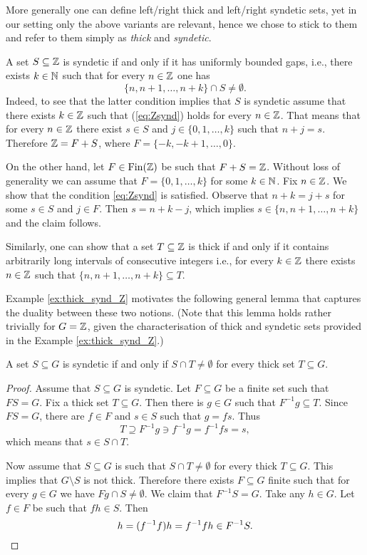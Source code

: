 \noindent
More generally one can define left/right thick and left/right syndetic sets, yet in our setting only the above variants are relevant, hence we chose to stick to them and refer to them simply as \emph{thick} and \emph{syndetic}.

\begin{example}\label{ex:thick_synd_Z}
A set $S\subseteq\mathbb{Z}$ is syndetic if and only if it has uniformly bounded gaps, i.e., there exists $k\in\mathbb{N}$ such that for every $n\in\mathbb{Z}$ one has 
\begin{equation}\label{eq:Zsynd}
\{n,n+1,\ldots,n+k\}\cap S\neq\emptyset.
\end{equation}
Indeed, to see that the latter condition implies that $S$ is syndetic assume that there exists $k\in\mathbb{Z}$ such that (\ref{eq:Zsynd}) holds for every $n\in\mathbb{Z}$. That means that for every $n\in\mathbb{Z}$ there exist $s\in S$ and $j\in\{0,1,\ldots,k\}$ such that $n+j=s$. 
Therefore $\mathbb{Z}=F+S$, where $F=\{-k,-k+1,\ldots,0\}$.

On the other hand, let $F\in\operatorname{Fin}(\mathbb{Z})$ be such that $F+S=\mathbb{Z}$. Without loss of generality we can assume that $F=\{0,1,\ldots,k\}$ for some $k\in\mathbb{N}$. Fix $n\in\mathbb{Z}$. We show that the condition \eqref{eq:Zsynd} is satisfied. Observe that $n+k= j+s$ for some $s\in S$ and $j\in F$. Then $s=n+k-j$, which implies $s\in\{n,n+1,\ldots,n+k\}$ and the claim follows.

Similarly, one can show that a set $T\subseteq\mathbb{Z}$ is thick if and only if it contains arbitrarily long intervals of consecutive integers i.e., for every $k\in \mathbb{Z}$ there exists $n\in\mathbb{Z}$ such that $\{n,n+1,\ldots,n+k\}\subseteq T$.
\end{example}
\noindent
Example \ref{ex:thick_synd_Z} motivates the following general lemma that captures the duality between these two notions. (Note that this lemma holds rather trivially for $G=\mathbb{Z}$, given the characterisation of thick and syndetic sets provided in the Example \ref{ex:thick_synd_Z}.)

\begin{lem}\label{lem:syndetic-thick}
A set $S\subseteq G$ is syndetic if and only if $S\cap T\neq\emptyset$ for every thick set $T\subseteq G$.
\end{lem}

\begin{proof}
Assume that $S\subseteq G$ is syndetic. Let $F\subseteq G$ be a finite set such that $FS=G$. Fix a thick set $T\subseteq G$. Then there is $g\in G$ such that $F^{-1}g\subseteq T$. Since $FS=G$, there are $f\in F$ and $s\in S$ such that $g=fs$. Thus 
\[
T\supseteq F^{-1}g \ni f^{-1}g = f^{-1}fs=s,
\] 
which means that $s\in S\cap T$.

\noindent
Now assume that $S\subseteq G$ is such that $S\cap T\neq\emptyset$ for every thick $T\subseteq G$. This implies that $G\setminus S$ is not thick. Therefore there exists $F\subseteq G$ finite such that for every $g\in G$ we have $Fg\cap S\neq \emptyset$. We claim that $ F^{-1}S=G$. Take any $h\in G$. Let $f\in F$ be such that $fh\in S$. Then 
\[
h=(f^{-1}f)h=f^{-1}fh\in F^{-1}S. \qedhere
\]
\end{proof}

